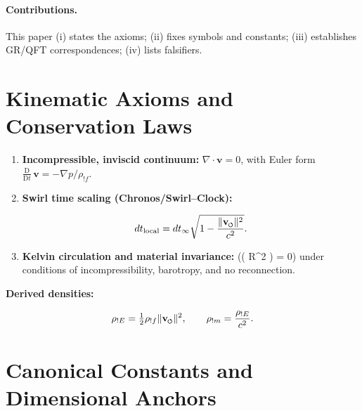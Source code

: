 \documentclass[11pt,a4paper]{article}
\newcommand{\swirlarrow}{\mathchoice{\mkern-2mu\scriptstyle\boldsymbol{\circlearrowleft}}{\mkern-2mu\scriptstyle\boldsymbol{\circlearrowleft}}{\mkern-2mu\scriptscriptstyle\boldsymbol{\circlearrowleft}}{\mkern-2mu\scriptscriptstyle\boldsymbol{\circlearrowleft}}}
\newcommand{\vswirl}{\mathbf{v}_{\swirlarrow}} %
\newcommand{\rhoF}{\rho_{!f}}                            %
\newcommand{\rhoE}{\rho_{!E}}                            %
\newcommand{\rhoM}{\rho_{!m}}                            %
\newcommand{\DDt}{\frac{\mathrm D}{\mathrm Dt}}         %
\newcommand{\CKInv}{\displaystyle \DDt ( R^2 \omega ) = 0}
\begin{document}
\paragraph{Contributions.}  This paper (i) states the axioms; (ii) fixes symbols and constants; (iii) establishes GR/QFT correspondences; (iv) lists falsifiers.



\section{Kinematic Axioms and Conservation Laws}

\label{sec:axioms}

\begin{enumerate}[label=K\arabic*., leftmargin=3.5em]

\item \textbf{Incompressible, inviscid continuum:} $\nabla\cdot\mathbf v = 0$, with Euler form $\DDt \, \mathbf v = -\nabla p/\rhoF$.

\item \textbf{Swirl time scaling (Chronos/Swirl--Clock):}

\begin{equation}
 dt_{\rm local} = dt_{\infty} \sqrt{1 - \frac{\lVert\vswirl\rVert^2}{c^2}}.
 \label{eq:swirl-time}
\end{equation}

\item \textbf{Kelvin circulation and material invariance:} (\CKInv) under conditions of incompressibility, barotropy, and no reconnection.

\end{enumerate}


\noindent \textbf{Derived densities:}

\begin{equation}
 \rhoE = \tfrac{1}{2} \rhoF \lVert\vswirl\rVert^2,\qquad \rhoM = \frac{\rhoE}{c^2}.\label{eq:densities}
\end{equation}



\section{Canonical Constants and Dimensional Anchors}

\label{sec:constants}
\end{document}
